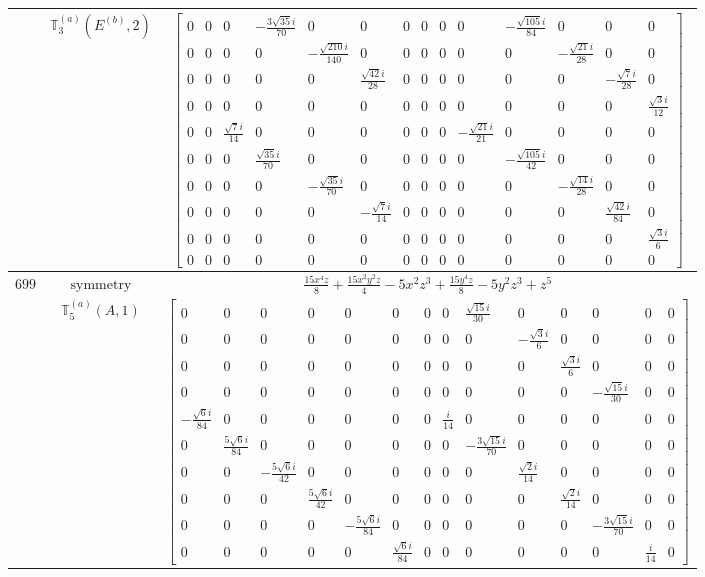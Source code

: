 \documentclass[fleqn,8pt,landscape]{jsarticle}
\begin{document}
\begin{longtable}{ccc}
$  $ & $ \mathbb{T}_{3}^{(a)}(E^{(b)},2) $ & $ \begin{bmatrix} 0 & 0 & 0 & - \frac{3 \sqrt{35} i}{70} & 0 & 0 & 0 & 0 & 0 & 0 & - \frac{\sqrt{105} i}{84} & 0 & 0 & 0 \\ 0 & 0 & 0 & 0 & - \frac{\sqrt{210} i}{140} & 0 & 0 & 0 & 0 & 0 & 0 & - \frac{\sqrt{21} i}{28} & 0 & 0 \\ 0 & 0 & 0 & 0 & 0 & \frac{\sqrt{42} i}{28} & 0 & 0 & 0 & 0 & 0 & 0 & - \frac{\sqrt{7} i}{28} & 0 \\ 0 & 0 & 0 & 0 & 0 & 0 & 0 & 0 & 0 & 0 & 0 & 0 & 0 & \frac{\sqrt{3} i}{12} \\ 0 & 0 & \frac{\sqrt{7} i}{14} & 0 & 0 & 0 & 0 & 0 & 0 & - \frac{\sqrt{21} i}{21} & 0 & 0 & 0 & 0 \\ 0 & 0 & 0 & \frac{\sqrt{35} i}{70} & 0 & 0 & 0 & 0 & 0 & 0 & - \frac{\sqrt{105} i}{42} & 0 & 0 & 0 \\ 0 & 0 & 0 & 0 & - \frac{\sqrt{35} i}{70} & 0 & 0 & 0 & 0 & 0 & 0 & - \frac{\sqrt{14} i}{28} & 0 & 0 \\ 0 & 0 & 0 & 0 & 0 & - \frac{\sqrt{7} i}{14} & 0 & 0 & 0 & 0 & 0 & 0 & \frac{\sqrt{42} i}{84} & 0 \\ 0 & 0 & 0 & 0 & 0 & 0 & 0 & 0 & 0 & 0 & 0 & 0 & 0 & \frac{\sqrt{3} i}{6} \\ 0 & 0 & 0 & 0 & 0 & 0 & 0 & 0 & 0 & 0 & 0 & 0 & 0 & 0 \end{bmatrix} $ \\ \hline
$ 699 $ & $ \text{symmetry} $ & $ \frac{15 x^{4} z}{8} + \frac{15 x^{2} y^{2} z}{4} - 5 x^{2} z^{3} + \frac{15 y^{4} z}{8} - 5 y^{2} z^{3} + z^{5} $ \\
$  $ & $ \mathbb{T}_{5}^{(a)}(A,1) $ & $ \begin{bmatrix} 0 & 0 & 0 & 0 & 0 & 0 & 0 & 0 & \frac{\sqrt{15} i}{30} & 0 & 0 & 0 & 0 & 0 \\ 0 & 0 & 0 & 0 & 0 & 0 & 0 & 0 & 0 & - \frac{\sqrt{3} i}{6} & 0 & 0 & 0 & 0 \\ 0 & 0 & 0 & 0 & 0 & 0 & 0 & 0 & 0 & 0 & \frac{\sqrt{3} i}{6} & 0 & 0 & 0 \\ 0 & 0 & 0 & 0 & 0 & 0 & 0 & 0 & 0 & 0 & 0 & - \frac{\sqrt{15} i}{30} & 0 & 0 \\ - \frac{\sqrt{6} i}{84} & 0 & 0 & 0 & 0 & 0 & 0 & \frac{i}{14} & 0 & 0 & 0 & 0 & 0 & 0 \\ 0 & \frac{5 \sqrt{6} i}{84} & 0 & 0 & 0 & 0 & 0 & 0 & - \frac{3 \sqrt{15} i}{70} & 0 & 0 & 0 & 0 & 0 \\ 0 & 0 & - \frac{5 \sqrt{6} i}{42} & 0 & 0 & 0 & 0 & 0 & 0 & \frac{\sqrt{2} i}{14} & 0 & 0 & 0 & 0 \\ 0 & 0 & 0 & \frac{5 \sqrt{6} i}{42} & 0 & 0 & 0 & 0 & 0 & 0 & \frac{\sqrt{2} i}{14} & 0 & 0 & 0 \\ 0 & 0 & 0 & 0 & - \frac{5 \sqrt{6} i}{84} & 0 & 0 & 0 & 0 & 0 & 0 & - \frac{3 \sqrt{15} i}{70} & 0 & 0 \\ 0 & 0 & 0 & 0 & 0 & \frac{\sqrt{6} i}{84} & 0 & 0 & 0 & 0 & 0 & 0 & \frac{i}{14} & 0 \end{bmatrix} $ \\ \hline

\end{longtable}
\end{document}

